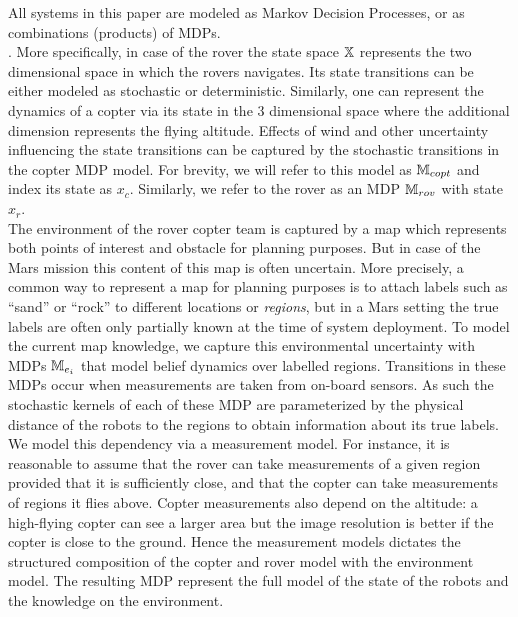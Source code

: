 \documentclass[conference]{IEEEtran}
\newcommand{\sofieNew}[1]{{\color{blue}#1}}
\begin{document}
All systems in this paper are modeled as Markov Decision Processes, or as combinations (products) of MDPs. \smallskip \\
\sofieNew{.
More specifically,  in case of the rover the state space $\mathbb{X}$ represents the two dimensional space in which the rovers navigates. Its state transitions can be either modeled as  stochastic or deterministic.
Similarly, one can represent the dynamics of a copter via its state in the 3 dimensional space where the additional dimension represents the flying altitude. Effects of wind and other uncertainty influencing the state transitions can be captured by the stochastic transitions in the copter MDP model. For brevity, we will refer to this model as $\mathbb{M}_{copt}$ and index its state as $x_c$. Similarly,   we refer to the rover as an MDP $\mathbb{M}_{rov}$ with state $x_r$.}
\smallskip\\
\sofieNew{The environment of the rover copter team is captured by a map which represents both points of interest and obstacle for planning purposes. But in case of the Mars mission this content of this map is often uncertain.
More precisely, a common way to represent a map for planning purposes is to attach labels such as ``sand'' or ``rock'' to different locations or \emph{regions}, but in a Mars setting the true labels are often only partially known at the time of system deployment. }
To model the current map knowledge, we capture 
 this environmental uncertainty with MDPs $\mathbb{M}_{e_i}$ that model belief dynamics over labelled regions. Transitions in these MDPs occur when measurements are taken from on-board sensors.  As such the stochastic kernels of each of these MDP are parameterized by the physical distance of the robots  to the regions to obtain information about its true labels.  We model this dependency via a  measurement model. %
 For instance, it is reasonable to assume that the rover can take measurements of a given region provided that it is sufficiently close, and that the copter can take measurements of regions it flies above. Copter measurements also depend on the altitude: a high-flying copter can see a larger area but the image resolution is better if the copter is close to the ground.    
Hence the measurement models dictates the structured composition of  the copter and rover model with the environment model. The resulting MDP represent the full model of the state of the robots and the knowledge on the environment.
\end{document}
